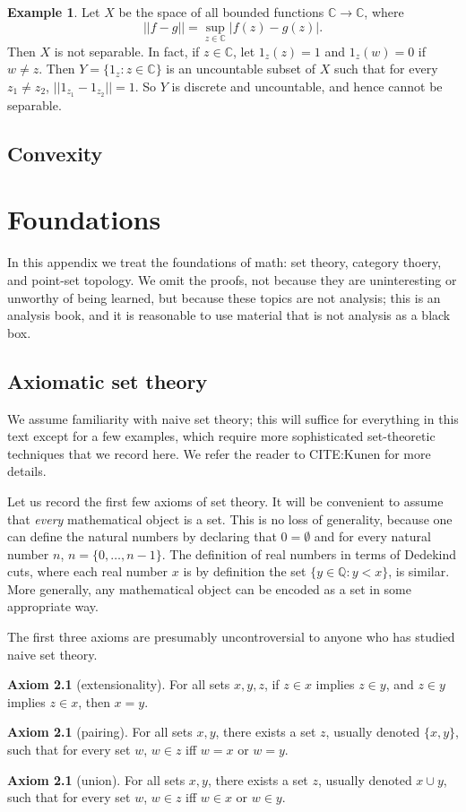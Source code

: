 \documentclass[12pt]{book}
\newcommand{\QQ}{\mathbb{Q}}
\newcommand{\CC}{\mathbb{C}}
\theoremstyle{definition}
\newtheorem{axiom}[theorem]{Axiom}
\newtheorem{example}[theorem]{Example}
\begin{document}
\begin{example}
\label{nonseparable space}
Let $X$ be the space of all bounded functions $\CC \to \CC$, where
$$||f - g|| = \sup_{z \in \CC}|f(z) - g(z)|.$$
Then $X$ is not separable. In fact, if $z \in \CC$, let $1_z(z) = 1$ and $1_z(w) = 0$ if $w \neq z$.
Then $Y=\{1_z: z \in \CC\}$ is an uncountable subset of $X$ such that for every $z_1 \neq z_2$, $||1_{z_1} - 1_{z_2}|| =1$.
So $Y$ is discrete and uncountable, and hence cannot be separable.
\end{example}

\section{Convexity}



\chapter{Foundations}
In this appendix we treat the foundations of math: set theory, category thoery, and point-set topology.
We omit the proofs, not because they are uninteresting or unworthy of being learned, but because these topics are not analysis; this is an analysis book, and it is reasonable to use material that is not analysis as a black box.

\section{Axiomatic set theory}
We assume familiarity with naive set theory; this will suffice for everything in this text except for a few examples, which require more sophisticated set-theoretic techniques that we record here.
We refer the reader to CITE:Kunen for more details.

Let us record the first few axioms of set theory.
It will be convenient to assume that \emph{every} mathematical object is a set.
This is no loss of generality, because one can define the natural numbers by declaring that $0 = \emptyset$ and for every natural number $n$, $n = \{0, \dots, n - 1\}$.
The definition of real numbers in terms of Dedekind cuts, where each real number $x$ is by definition the set $\{y \in \QQ: y < x\}$, is similar.
More generally, any mathematical object can be encoded as a set in some appropriate way.

The first three axioms are presumably uncontroversial to anyone who has studied naive set theory.

\begin{axiom}[extensionality]
For all sets $x, y, z$, if $z \in x$ implies $z \in y$, and $z \in y$ implies $z \in x$, then $x = y$.
\end{axiom}
\begin{axiom}[pairing]
For all sets $x, y$, there exists a set $z$, usually denoted $\{x, y\}$, such that for every set $w$, $w \in z$ iff $w = x$ or $w = y$.
\end{axiom}
\begin{axiom}[union]
For all sets $x, y$, there exists a set $z$, usually denoted $x \cup y$, such that for every set $w$, $w \in z$ iff $w \in x$ or $w \in y$.
\end{axiom}
\end{document}
